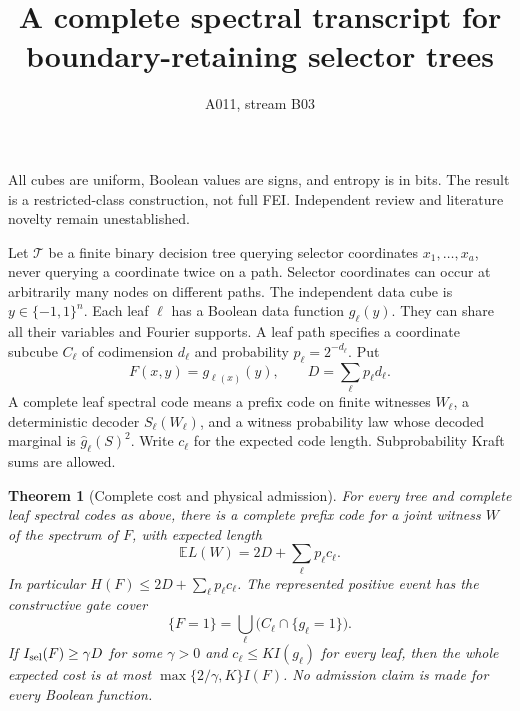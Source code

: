 \documentclass{article}
\newtheorem{theorem}{Theorem}
\begin{document}
\title{A complete spectral transcript for boundary-retaining selector trees}
\author{A011, stream B03}
\maketitle
All cubes are uniform, Boolean values are signs, and entropy is in bits.
The result is a restricted-class construction, not full FEI. Independent
review and literature novelty remain unestablished.

Let $\mathcal T$ be a finite binary decision tree querying selector
coordinates $x_1,\ldots,x_a$, never querying a coordinate twice on a path.
Selector coordinates can occur at arbitrarily many nodes on different paths.
The independent data cube is $y\in\{-1,1\}^n$. Each leaf $\ell$ has a
Boolean data function $g_\ell(y)$. They can share all their variables and
Fourier supports. A leaf path specifies a coordinate subcube $C_\ell$ of
codimension $d_\ell$ and probability $p_\ell=2^{-d_\ell}$. Put
\[
 F(x,y)=g_{\ell(x)}(y),\qquad D=\sum_\ell p_\ell d_\ell.
\]
A complete leaf spectral code means a prefix code on finite witnesses
$W_\ell$, a deterministic decoder $S_\ell(W_\ell)$, and a witness probability
law whose decoded marginal is $\widehat g_\ell(S)^2$. Write $c_\ell$ for
the expected code length. Subprobability Kraft sums are allowed.

\begin{theorem}[Complete cost and physical admission]
For every tree and complete leaf spectral codes as above, there is a
complete prefix code for a joint witness $W$ of the spectrum of $F$, with
expected length
\[
 \mathbb E L(W)=2D+\sum_\ell p_\ell c_\ell.
\]
In particular $H(F)\le 2D+\sum_\ell p_\ell c_\ell$.
The represented positive event has the constructive gate cover
\[
 \{F=1\}=\bigcup_\ell \bigl(C_\ell\cap\{g_\ell=1\}\bigr).
\]
If $I_{\rm sel}(F)\ge\gamma D$ for some $\gamma>0$ and
$c_\ell\le K I(g_\ell)$ for every leaf, then the whole expected cost is
at most $\max\{2/\gamma,K\} I(F)$.
No admission claim is made for every Boolean function.
\end{theorem}
\end{document}
